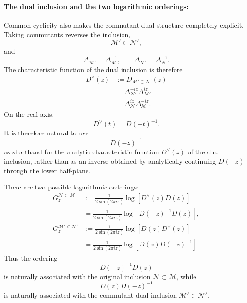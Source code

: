 \documentclass[a4paper,11pt]{article}
\theoremstyle{definition}
\newcommand{\mN}{\mathcal{N}}
\newcommand{\mM}{\mathcal{M}}
\begin{document}
\paragraph{The dual inclusion and the two logarithmic orderings:} Common cyclicity also makes the commutant-dual structure completely explicit.
Taking commutants reverses the inclusion,
\begin{equation}
    \mM'\subset\mN',
\end{equation}
and
\begin{equation}
    \Delta_{\mM'}=\Delta_{\mM}^{-1},
    \qquad
    \Delta_{\mN'}=\Delta_{\mN}^{-1}.
\end{equation}
The characteristic function of the dual inclusion is therefore
\begin{align}
    D^\vee(z)
    &:=
    D_{\mM'\subset\mN'}(z)
    \nonumber\\
    &=
    \Delta_{\mN'}^{-iz}
    \Delta_{\mM'}^{iz}
    \nonumber\\
    &=
    \Delta_{\mN}^{iz}
    \Delta_{\mM}^{-iz}.
    \label{eq:D-dual-common}
\end{align}
On the real axis,
\begin{equation}
    D^\vee(t)=D(-t)^{-1}.
    \label{eq:D-dual-real}
\end{equation}
It is therefore natural to use
\begin{equation}
    D(-z)^{-1}
\end{equation}
as shorthand for the analytic characteristic function $D^\vee(z)$ of the
dual inclusion, rather than as an inverse obtained by analytically
continuing $D(-z)$ through the lower half-plane.

There are two possible logarithmic orderings:
\begin{align}
    G_z^{\mN\subset\mM}
    &:=
    \frac{1}{2\sin(2\pi iz)}
    \log\left[
        D^\vee(z)D(z)
    \right]
    \nonumber\\
    &=
    \frac{1}{2\sin(2\pi iz)}
    \log\left[
        D(-z)^{-1}D(z)
    \right],
    \label{eq:G-original-common}
    \\
    G_z^{\mM'\subset\mN'}
    &:=
    \frac{1}{2\sin(2\pi iz)}
    \log\left[
        D(z)D^\vee(z)
    \right]
    \nonumber\\
    &=
    \frac{1}{2\sin(2\pi iz)}
    \log\left[
        D(z)D(-z)^{-1}
    \right].
    \label{eq:G-dual-common}
\end{align}
Thus the ordering
\begin{equation}
    D(-z)^{-1}D(z)
\end{equation}
is naturally associated with the original inclusion
$\mN\subset\mM$, while
\begin{equation}
    D(z)D(-z)^{-1}
\end{equation}
is naturally associated with the commutant-dual inclusion
$\mM'\subset\mN'$.
\end{document}

